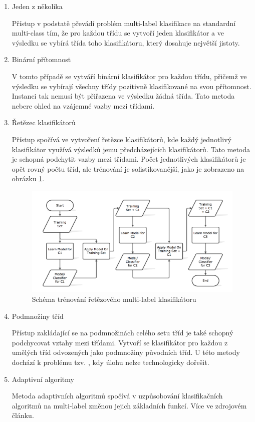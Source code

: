 \documentclass[thesis=M,czech]{FITthesis}[2019/12/23]
\begin{document}
\begin{enumerate}
    \item Jeden z několika
    
    Přístup  v podstatě převádí problém multi-label klasifikace na standardní multi-class tím, že pro každou třídu se vytvoří jeden klasifikátor a ve výsledku se vybírá třída toho klasifikátoru, který dosahuje největší jistoty.
    
    \item Binární přítomnost
    
    V tomto případě se vytváří binární klasifikátor pro každou třídu, přičemž ve výsledku se vybírají všechny třídy pozitivně klasifikované na svou přítomnost. Instanci tak nemusí být přiřazena ve výsledku žádná třída. Tato metoda nebere ohled na vzájemné vazby mezi třídami.
    
    \item Řetězec klasifikátorů
    
    Přístup spočívá ve vytvoření řetězce klasifikátorů, kde každý jednotlivý klasifikátor využívá výsledků jemu předcházejících klasifikátorů. Tato metoda je schopná podchytit vazby mezi třídami. Počet jednotlivých klasifikátorů je opět rovný počtu tříd, ale trénování je sofistikovanější, jako je zobrazeno na obrázku \ref{fig:nooney2018multiclass}.

    \begin{figure}\centering
    	\includegraphics[width=1\textwidth]{images/nooney2018_multilable.png}
    	\caption{Schéma trénování řetězového multi-label klasifikátoru\cite{nooney2018}}\label{fig:nooney2018multiclass}
    \end{figure}
    
    \item Podmnožiny tříd
    
    Přístup zakládající se na podmnožinách celého setu tříd je také schopný podchycovat vztahy mezi třídami. Vytvoří se klasifikátor pro každou z umělých tříd odvozených jako podmnožiny původních tříd. U této metody dochází k problému tzv. , kdy úlohu nelze technologicky dořešit.
    
    \item Adaptivní algoritmy
    
    Metoda adaptivních algoritmů spočívá v uzpůsobování  klasifikačních algoritmů na multi-label změnou jejich základních funkcí. Více ve zdrojovém článku\cite{nooney2018}.
    
\end{enumerate}
\end{document}
